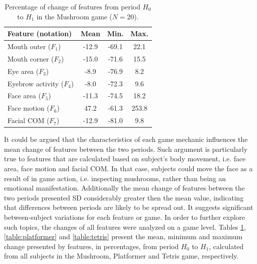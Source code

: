 \begin{table}
    \caption{Percentage of change of features from period $H_0$ to $H_1$ in the Mushroom game ($N=20$).}
    \label{table:mushroom}
    \centering
    \begin{threeparttable}
        \begin{tabular}{lccc}
            \toprule%
                \textbf{Feature (notation)} & \textbf{Mean} & \textbf{Min.} & \textbf{Max.} \\
            \midrule%
                Mouth outer ($F_1$)      & -12.9 & -69.1  &  22.1  \\
                Mouth corner ($F_2$)     & -15.0 & -71.6  &  15.5  \\
                Eye area ($F_3$)         & -8.9  & -76.9  &  8.2   \\
                Eyebrow activity ($F_4$) & -8.0  & -72.3  &  9.6   \\
                Face area ($F_5$)        & -11.3 & -74.5  &  18.2  \\
                Face motion ($F_6$)      & 47.2  & -61.3  &  253.8 \\
                Facial COM ($F_7$)       & -12.9 & -81.0  &  9.8   \\
            \bottomrule%
        \end{tabular}
        \begin{tablenotes}
          \small
          \item[]{}
        \end{tablenotes}
    \end{threeparttable}
\end{table}

It could be argued that the characteristics of each game mechanic influences the mean change of features between the two periods. Such argument is particularly true to features that are calculated based on subject's body movement, i.e. face area, face motion and facial COM. In that case, subjects could move the face as a result of in game action, i.e. inspecting mushrooms, rather than being an emotional manifestation. Additionally the mean change of features between the two periods presented SD considerably greater then the mean value, indicating that differences between periods are likely to be spread out. It suggests significant between-subject variations for each feature or game. In order to further explore such topics, the changes of all features were analyzed on a game level. Tables \ref{table:mushroom}, \ref{table:platformer} and \ref{table:tetris} present the mean, minimum and maximum change presented by features, in percentages, from period $H_0$ to $H_1$, calculated from all subjects in the Mushroom, Platformer and Tetris game, respectively.

